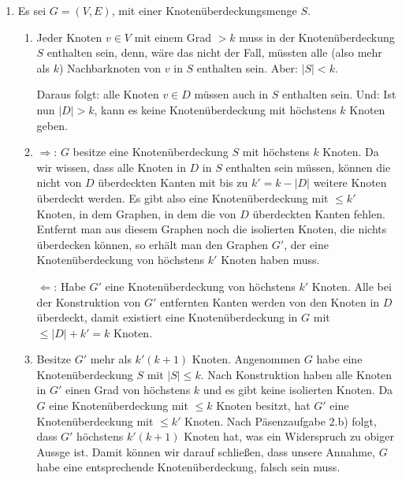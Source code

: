 \documentclass[a4paper]{scrartcl}
\begin{document}
\begin{enumerate}[label=\bfseries \arabic*.]
\item %
    Es sei $G = (V, E)$, mit einer Knotenüberdeckungsmenge $S$.

\begin{enumerate}
    \item %
        Jeder Knoten $v \in V$ mit einem Grad $> k$ muss in der
        Knotenüberdeckung $S$ enthalten sein, denn, wäre das nicht der Fall,
        müssten alle (also mehr als $k$) Nachbarknoten von $v$ in $S$ enthalten sein.
        Aber: $|S| < k$.

        Daraus folgt: alle Knoten $v \in D$ müssen auch in $S$ enthalten sein.
        Und: Ist nun $|D| > k$, kann es keine Knotenüberdeckung mit höchstens
        $k$ Knoten geben.

    \item %
        $\Rightarrow$:
        $G$ besitze eine Knotenüberdeckung $S$ mit höchstens $k$ Knoten.
        Da wir wissen, dass alle Knoten in $D$ in $S$ enthalten sein müssen,
        können die nicht von $D$ überdeckten Kanten mit bis zu $k' = k - |D|$
        weitere Knoten überdeckt werden.
        Es gibt also eine Knotenüberdeckung mit $\leq k'$ Knoten, in dem
        Graphen, in dem die von $D$ überdeckten Kanten fehlen.
        Entfernt man aus diesem Graphen noch die isolierten Knoten, die nichts
        überdecken können, so erhält man den Graphen $G'$, der eine
        Knotenüberdeckung von höchstens $k'$ Knoten haben muss.

        $\Leftarrow$:
        Habe $G'$ eine Knotenüberdeckung von höchstens $k'$ Knoten.
        Alle bei der Konstruktion von $G'$ entfernten Kanten werden von den
        Knoten in $D$ überdeckt, damit existiert eine Knotenüberdeckung in $G$
        mit $\leq |D| + k' = k$ Knoten.

    \item %
        Besitze $G'$ mehr als $k'(k+1)$ Knoten.
        Angenommen $G$ habe eine Knotenüberdeckung $S$ mit $|S| \leq k$.
        Nach Konstruktion haben alle Knoten in $G'$ einen Grad von höchstens
        $k$ und es gibt keine isolierten Knoten.
        Da $G$ eine Knotenüberdeckung mit $\leq k$ Knoten besitzt, hat $G'$
        eine Knotenüberdeckung mit $\leq k'$ Knoten.
        Nach Päsenzaufgabe 2.b) folgt, dass $G'$ höchstens $k'(k+1)$ Knoten hat,
        was ein Widerspruch zu obiger Aussge ist. Damit können wir darauf
        schließen, dass unsere Annahme, $G$ habe eine entsprechende
        Knotenüberdeckung, falsch sein muss.




\end{enumerate}
\end{enumerate}
\end{document}
